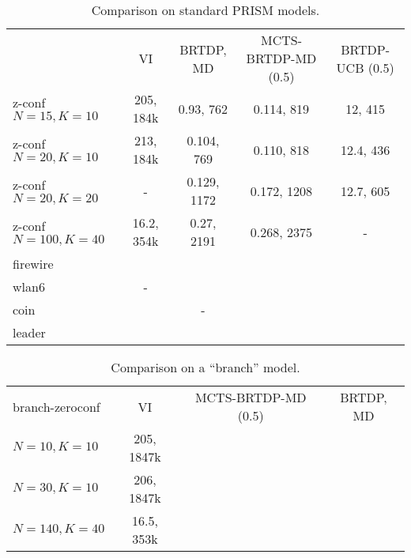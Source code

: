 \begin{landscape}

\begin{table}
\begin{tabularx}{\textwidth}{ l  | c | c | c | c }
                   & VI           &  BRTDP, MD       & MCTS-BRTDP-MD (0.5) & BRTDP-UCB (0.5)  \\
z-conf $N=15,  K=10$ & 205, 184k    &  0.93, 762       & 0.114, 819          &  12, 415         \\
z-conf $N=20,  K=10$ & 213, 184k    &  0.104, 769      & 0.110, 818          & 12.4, 436        \\
z-conf $N=20, K=20$  & -            &  0.129, 1172     & 0.172, 1208         & 12.7, 605        \\
z-conf $N=100, K=40$ & 16.2, 354k   &  0.27, 2191      & 0.268, 2375         & -                \\
firewire           &              &                  &                     & \\
wlan6              & -            &                  &                     & \\
coin               &              & -                &                     & \\
leader             &              &                  &                     &
\end{tabularx}
\caption{Comparison on standard PRISM models.}
\label{table:general_comparison}
\end{table}

\begin{table}
\begin{tabularx}{\textwidth}{ l  | c | c | c }
branch-zeroconf &    VI       & MCTS-BRTDP-MD (0.5) & BRTDP, MD  \\
$N=10,  K=10$     & 205, 1847k  &                     &            \\
$N=30,  K=10$     & 206, 1847k  &                     &            \\
$N=140, K=40$     & 16.5, 353k  &                     &
\end{tabularx}
\caption{Comparison on a ``branch'' model.}
\label{table:branch_zconf}
\end{table}

\end{landscape}

